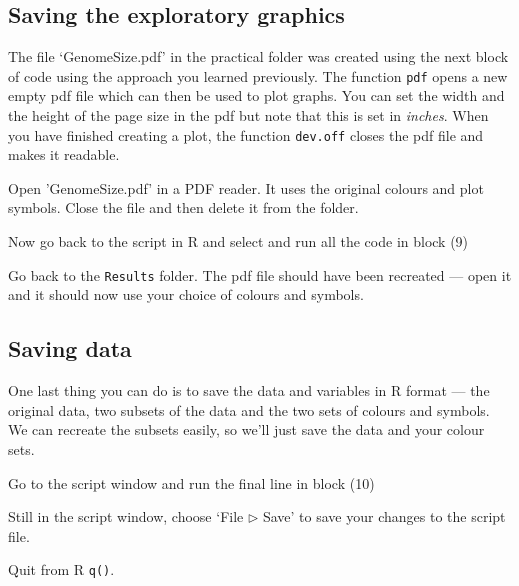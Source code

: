 \subsection{Saving the exploratory graphics}
The file `GenomeSize.pdf' in the practical folder was created using the 
next block of code using the approach you learned previously. 
The function {\tt pdf} opens a new empty pdf file  which can then be 
used to plot graphs. You can set the width and the height of the page 
size in the pdf but note that this is set in {\it inches}. When you 
have finished creating a plot, the function {\tt dev.off} closes the 
pdf file and makes it readable.

\begin{compactitem}[$\quad\star$]
\item Open 'GenomeSize.pdf' in a PDF reader. It uses the original 
colours and plot symbols. Close the file and then delete it from the 
folder.
\item Now go back to the script in R and select and run all the code in 
block (9)
\item Go back to the {\tt Results} folder. The pdf file should have 
been recreated --- open it and it should now use your choice of colours 
and symbols.
\end{compactitem}

\subsection{Saving data}

One last thing you can do is to save the data and variables in R format 
--- the original data, two subsets of the data and the two sets of 
colours and symbols. We can recreate the subsets easily, so we'll just 
save the data and your colour sets.

\begin{compactitem}[$\quad\star$]
\item Go to the script window and run the final line in block (10)
\item Still in the script window, choose `File $\triangleright$ Save' 
to save your changes to the script file.
\item Quit from R {\tt q()}.
\end{compactitem}

